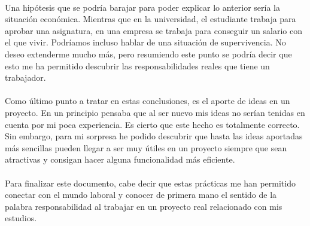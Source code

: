 \documentclass[a4paper,12pt]{article}
\begin{document}
\\
Una hipótesis que se podría barajar para poder explicar lo anterior sería la situación económica. Mientras que en la universidad, el estudiante trabaja para aprobar una asignatura, en una empresa se trabaja para conseguir un salario con el que vivir. Podríamos incluso hablar de una situación de supervivencia. No deseo extenderme mucho más, pero resumiendo este punto se podría decir que esto me ha permitido descubrir las responsabilidades reales que tiene un trabajador. \\
\\
Como último punto a tratar en estas conclusiones, es el aporte de ideas en un proyecto. En un principio pensaba que al ser nuevo mis ideas no serían tenidas en cuenta por mi poca experiencia. Es cierto que este hecho es totalmente correcto. Sin embargo, para mi sorpresa he podido descubrir que hasta las ideas aportadas más sencillas pueden llegar a ser muy útiles en un proyecto siempre que sean atractivas y consigan hacer alguna funcionalidad más eficiente.\\
\\
Para finalizar este documento, cabe decir que estas prácticas me han permitido conectar con el mundo laboral y conocer de primera mano el sentido de la palabra responsabilidad al trabajar en un proyecto real relacionado con mis estudios.
\end{document}
